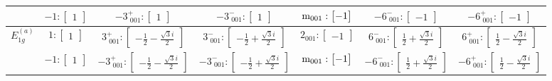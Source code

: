 \documentclass[fleqn,8pt,landscape]{jsarticle}
\begin{document}
\begin{longtable}{ccccccc}
& $ -1:\begin{bmatrix} 1 \end{bmatrix} $ & $ -3^{+}_{\,\,001}:\begin{bmatrix} 1 \end{bmatrix} $ & $ -3^{-}_{\,\,001}:\begin{bmatrix} 1 \end{bmatrix} $ & $ {\rm m}_{001}:\begin{bmatrix} -1 \end{bmatrix} $ & $ -6^{-}_{\,\,001}:\begin{bmatrix} -1 \end{bmatrix} $ & $ -6^{+}_{\,\,001}:\begin{bmatrix} -1 \end{bmatrix} $ \\ \hline
$ E_{1g}^{(a)} $ & $ 1:\begin{bmatrix} 1 \end{bmatrix} $ & $ 3^{+}_{\,\,001}:\begin{bmatrix} - \frac{1}{2} - \frac{\sqrt{3} i}{2} \end{bmatrix} $ & $ 3^{-}_{\,\,001}:\begin{bmatrix} - \frac{1}{2} + \frac{\sqrt{3} i}{2} \end{bmatrix} $ & $ 2{}_{001}:\begin{bmatrix} -1 \end{bmatrix} $ & $ 6^{-}_{\,\,001}:\begin{bmatrix} \frac{1}{2} + \frac{\sqrt{3} i}{2} \end{bmatrix} $ & $ 6^{+}_{\,\,001}:\begin{bmatrix} \frac{1}{2} - \frac{\sqrt{3} i}{2} \end{bmatrix} $ \\
& $ -1:\begin{bmatrix} 1 \end{bmatrix} $ & $ -3^{+}_{\,\,001}:\begin{bmatrix} - \frac{1}{2} - \frac{\sqrt{3} i}{2} \end{bmatrix} $ & $ -3^{-}_{\,\,001}:\begin{bmatrix} - \frac{1}{2} + \frac{\sqrt{3} i}{2} \end{bmatrix} $ & $ {\rm m}_{001}:\begin{bmatrix} -1 \end{bmatrix} $ & $ -6^{-}_{\,\,001}:\begin{bmatrix} \frac{1}{2} + \frac{\sqrt{3} i}{2} \end{bmatrix} $ & $ -6^{+}_{\,\,001}:\begin{bmatrix} \frac{1}{2} - \frac{\sqrt{3} i}{2} \end{bmatrix} $ \\ \hline

\end{longtable}
\end{document}
